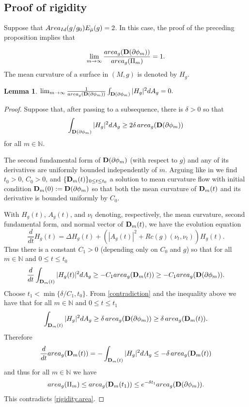 \documentclass[11pt]{amsart}
\def\N{\mathbb N}
\newtheorem{lemm}[thm]{Lemma}
\theoremstyle{remark}
\theoremstyle{definition}
\begin{document}
{{	\subsection{Proof of rigidity} Suppose that ${\rm Area}_{{\rm Id}}(g/g_0) {E_{\bar\mu}(g)}=2$. In this case, the proof of the preceding  proposition implies that
	
	\begin{equation}\label{rigidity.area}
		\lim_{m\to\infty}\frac{{\rm area}_g({\bf D}(\partial\phi_m))}{{\rm area}_g(\Pi_m)}=1.
	\end{equation}
	The mean curvature of a surface in $(M,g)$  is denoted by $H_g$.
	\begin{lemm}
		$\lim_{m\to\infty}\frac{1}{{\rm area}_g({\bf D}(\partial\phi_m))}\int_{{\bf D}(\partial\phi_m)}|H_g|^2dA_g=0.$
	\end{lemm}
	\begin{proof}
		Suppose that, after passing to a subsequence, there is $\delta>0$ so that
		\begin{equation}\label{contradiction}
			\int_{{\bf D}(\partial\phi_m)}|H_g|^2dA_g\geq 2\delta\, {\rm area}_g({\bf D}(\partial\phi_m))
		\end{equation}
		for all $m\in\N$.
		
		The second fundamental form of ${\bf D}(\partial\phi_m)$ (with respect to $g$) and any of its derivatives are uniformly bounded independently of $m$. Arguing like in \cite[Corollary 4.4]{ecker-huisken} we find  $t_0>0$, $C_0>0$, and $\{{\bf D}_m(t)\}_{0\leq t\leq t_0}$ a solution to mean curvature flow with initial condition ${\bf D}_m(0):={\bf D}(\partial\phi_m)$ so that both the mean curvature of ${\bf D}_m(t)$ and its derivative  is bounded uniformly by $C_0$. 
		
		With $H_g(t)$, $A_g(t)$, and $\nu_t$ denoting, respectively, the mean curvature, second fundamental form, and normal vector of ${\bf D}_m(t)$, we have  the evolution equation
		$$\frac{d}{dt}H_g(t)= \Delta H_g(t)+(|A_g(t)|^2+Rc(g)(\nu_t,\nu_t))H_g(t).$$
		Thus there is a constant $C_1>0$ (depending only on $C_0$ and $g$) so that for all $m\in \N$ and $0\leq t\leq t_0$
		$$\frac{d}{dt}\int_{{\bf D}_m(t)}|H_g(t)|^2dA_g \geq -C_1{\rm area}_g({\bf D}_m(t))\geq -C_1{\rm area}_g({\bf D}(\partial\phi_m)).$$
		Choose $t_1<\min\{{\delta/C_1}, t_0\}$. From \eqref{contradiction} and the inequality  above we have that for all  $m\in \N$ and $0\leq t\leq t_1$
		$$\int_{{\bf D}_m(t)}|H_g|^2dA_g\geq \delta\,{\rm area}_g({\bf D}(\partial\phi_m))\geq \delta\, {\rm area}_g({\bf D}_m(t)).$$
		Therefore
		$$ \frac{d}{dt}{\rm area}_g({\bf D}_m(t))=-\int_{{\bf D}_m(t)}|H_g|^2dA_g\leq -\delta\, {\rm area}_g({\bf D}_m(t))$$
		and thus for all $m\in \N$ we have
		$${\rm area}_g(\Pi_m)\leq  {\rm area}_g({\bf D}_m(t_1))\leq e^{-\delta t_1}{\rm area}_g({\bf D}(\partial\phi_m)).$$
		This contradicts \eqref{rigidity.area}. 
	\end{proof}
	
}}
\end{document}
